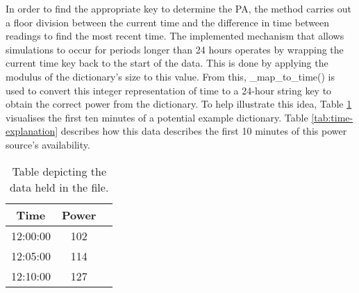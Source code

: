 \documentclass{l4proj}
\begin{document}
In order to find the appropriate key to determine the PA, the method carries out a floor division between the current time and the difference in time between readings to find the most recent time.
The implemented mechanism that allows simulations to occur for periods longer than 24 hours operates by wrapping the current time key back to the start of the data.
This is done by applying the modulus of the dictionary's size to this value.
From this, \_map\_to\_time() is used to convert this integer representation of time to a 24-hour string key to obtain the correct power from the dictionary.
To help illustrate this idea, Table \ref{tab:data-dic} visualises the first ten minutes of a potential example dictionary.
Table \ref{tab:time-explanation} describes how this data describes the first 10 minutes of this power source's availability.
\begin{table}[h]
    \caption{Table depicting the data held in the file.}
    \label{tab:data-dic}
    \centering
    \begin{tabular}{@{}ccc@{}}
    \toprule
    \textbf{Time} & \textbf{Power} \\
    \midrule
    12:00:00      & 102            \\
    12:05:00      & 114            \\
    12:10:00      & 127            \\
    \bottomrule
    \end{tabular}


\end{table}
\end{document}
